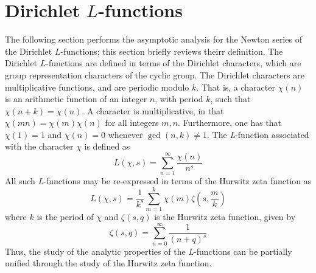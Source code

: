 \documentclass{amsart}
\begin{document}
\section{Dirichlet $L$-functions}

The following section performs the asymptotic analysis for the Newton
series of the Dirichlet $L$-functions; this section briefly reviews
theirr definition. The Dirichlet $L$-functions\cite{Apostol76,Davenport80} are defined
in terms of the Dirichlet characters, which are group representation
characters of the cyclic group. 
The Dirichlet characters are multiplicative functions, and are periodic
modulo $k$. That is, a character $\chi(n)$ is an arithmetic function
of an integer $n$, with period $k$, such that $\chi(n+k)=\chi(n)$.
A character is multiplicative, in that $\chi(mn)=\chi(m)\chi(n)$
for all integers $m,n$. Furthermore, one has that $\chi(1)=1$ and
$\chi(n)=0$ whenever $\gcd(n,k)\ne1$. The \emph{L}-function associated
with the character $\chi$ is defined as \begin{equation}
L(\chi,s)=\sum_{n=1}^{\infty}\frac{\chi(n)}{n^{s}}\label{eq:}\end{equation}
 All such \emph{L}-functions may be re-expressed in terms of the Hurwitz
zeta function as
\begin{equation}
L(\chi,s)=\frac{1}{k^{s}}\sum_{m=1}^{k}\chi(m)\zeta\left(s,\frac{m}{k}\right)\label{eq:L-Hurwitz}\end{equation}
 where $k$ is the period of $\chi$ and $\zeta(s,q)$ is the Hurwitz
zeta function, given by \begin{equation}
\zeta(s,q)=\sum_{n=0}^{\infty}\frac{1}{(n+q)^{s}}\label{eq:}\end{equation}
 Thus, the study of the analytic properties of the \emph{L}-functions
can be partially unified through the study of the Hurwitz zeta function.


\end{document}
